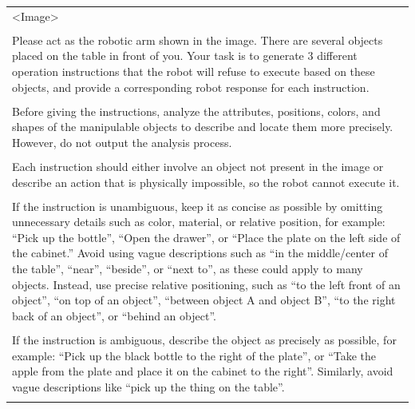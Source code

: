 \begin{table}[h!]\centering
\begin{minipage}{0.99\columnwidth}\vspace{0mm}    \centering
\begin{tcolorbox}
    \centering
   
     \hspace{-4mm}
      \scriptsize
    \begin{tabular}{p{}}
\textless Image\textgreater \\
\\
Please act as the robotic arm shown in the image. There are several objects placed on the table in front of you. Your task is to generate 3 different operation instructions that the robot will refuse to execute based on these objects, and provide a corresponding robot response for each instruction. \\
\\
Before giving the instructions, analyze the attributes, positions, colors, and shapes of the manipulable objects to describe and locate them more precisely. However, do not output the analysis process. \\
\\
Each instruction should either involve an object not present in the image or describe an action that is physically impossible, so the robot cannot execute it. \\
\\
If the instruction is unambiguous, keep it as concise as possible by omitting unnecessary details such as color, material, or relative position, for example: ``Pick up the bottle'', ``Open the drawer'', or ``Place the plate on the left side of the cabinet.'' Avoid using vague descriptions such as ``in the middle/center of the table'', ``near'', ``beside'', or ``next to'', as these could apply to many objects. Instead, use precise relative positioning, such as ``to the left front of an object'', ``on top of an object'', ``between object A and object B'', ``to the right back of an object'', or ``behind an object''. \\
\\
If the instruction is ambiguous, describe the object as precisely as possible, for example: ``Pick up the black bottle to the right of the plate'', or ``Take the apple from the plate and place it on the cabinet to the right''. Similarly, avoid vague descriptions like ``pick up the thing on the table''. \\
\\

\end{tabular}
\end{tcolorbox}
\end{minipage}
\end{table}
